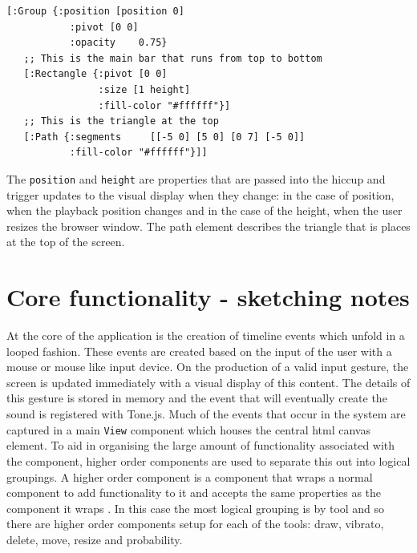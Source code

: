 \documentclass[12pt]{report}
\begin{document}
\begin{footnotesize}
\begin{verbatim}
[:Group {:position [position 0]
           :pivot [0 0]
           :opacity    0.75}
   ;; This is the main bar that runs from top to bottom
   [:Rectangle {:pivot [0 0]
                :size [1 height]
                :fill-color "#ffffff"}]
   ;; This is the triangle at the top
   [:Path {:segments     [[-5 0] [5 0] [0 7] [-5 0]]
           :fill-color "#ffffff"}]]
\end{verbatim}
\end{footnotesize}

The \texttt{position} and \texttt{height} are properties that are passed into the hiccup and
trigger updates to the visual display when they change: in the case of position,
when the playback position changes and in the case of the height, when the user
resizes the browser window. The path element describes the triangle that is
places at the top of the screen.


\chapter{Core functionality - sketching notes}
\label{sec:org77eb303}
At the core of the application is the creation of timeline events which unfold
in a looped fashion. These events are created based on the input of the user
with a mouse or mouse like input device. On the production of a valid input
gesture, the screen is updated immediately with a visual display of this
content. The details of this gesture is stored in memory and the event that will
eventually create the sound is registered with Tone.js. Much of the events that
occur in the system are captured in a main \texttt{View} component which houses the
central html canvas element. To aid in organising the large amount of
functionality associated with the component, higher order components are used to
separate this out into logical groupings. A higher order component is a
component that wraps a normal component to add functionality to it and accepts
the same properties as the component it wraps \cite{facebook_higher-order_2017}.
In this case the most logical grouping is by tool and so there are higher order
components setup for each of the tools: draw, vibrato, delete, move, resize and
probability.
\end{document}
